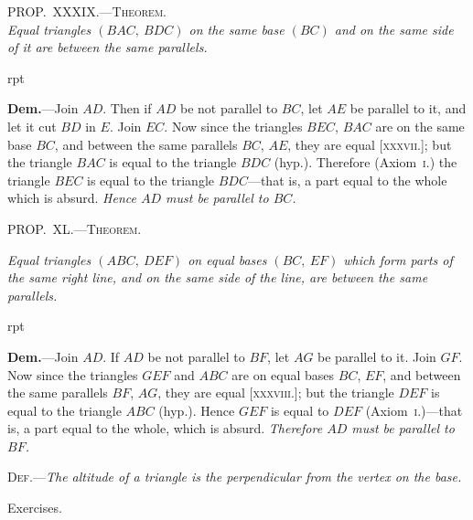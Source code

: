 \documentclass[oneside]{book}
\newcommand\myprop[2]{
\bigskip\Needspace*{4\baselineskip}\begin{center}\textsc{#1}\\\medskip\emph{#2}\par\end{center}
}
\newcommand\mypropl[2]{
\bigskip\Needspace*{4\baselineskip}\begin{center}\textsc{#1}\end{center}
\hspace{\parindent}\emph{#2}\par\medskip
}
\newcommand\exhead[1]{
\Needspace*{5\baselineskip}\begin{center}
\textsf{#1}
\end{center}
}
\newcommand\imgflow[3]{
\setcounter{wrapwidth}{#1}
\begin{wrapfigure}[#2]{r}{\value{wrapwidth}pt}
\begin{center}
\vspace{-0.3in}
\end{center}
\end{wrapfigure}
}
\begin{document}
\myprop{PROP\@.~XXXIX\@.---Theorem.}{Equal triangles $(BAC,\ BDC)$ on the same base $(BC)$ and
on the same side of it are between the same parallels.}

\imgflow{128}{8}{f059}

\textbf{Dem.}---Join $AD$. Then if $AD$ be not parallel to $BC$,
let $AE$ be parallel to it, and
let it cut $BD$ in $E$. Join $EC$.
Now since the triangles $BEC$,
$BAC$ are on the same base $BC$,
and between the same parallels
$BC$, $AE$, they are equal [\textsc{xxxvii}.];
but the triangle $BAC$ is equal
to the triangle $BDC$ (hyp.).
Therefore (Axiom~\textsc{i}.) the triangle $BEC$ is equal to
the triangle $BDC$---that is, a part equal to the whole
which is absurd. \emph{Hence $AD$ must be parallel to $BC$.}


\mypropl{PROP\@.~XL\@.---Theorem.}{Equal triangles $(ABC,\ DEF)$ on equal bases $(BC,\ EF)$
which form parts of the same right line, and on the same
side of the line, are between the same parallels.}

\imgflow{170}{7}{f060}

\textbf{Dem.}---Join $AD$. If $AD$ be not parallel to $BF$, let
$AG$ be parallel to it.
Join $GF$. Now since
the triangles $GEF$ and
$ABC$ are on equal bases
$BC$, $EF$, and between
the same parallels $BF$,
$AG$, they are equal
[\textsc{xxxviii}.]; but the triangle
$DEF$ is equal to the triangle $ABC$ (hyp.). Hence
$GEF$ is equal to $DEF$ (Axiom~\textsc{i}.)---that is, a part equal
to the whole, which is absurd. \emph{Therefore $AD$ must be
parallel to $BF$.}\par\medskip

\textsc{Def}.---\emph{The altitude of a triangle is the perpendicular
from the vertex on the base.}


\exhead{Exercises.}
\end{document}
